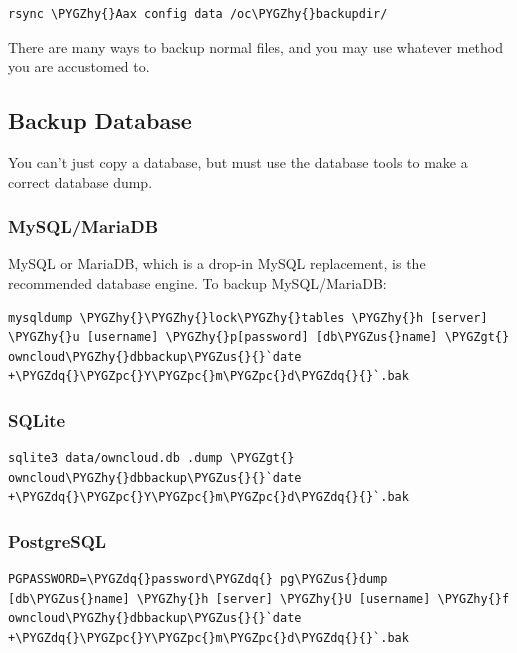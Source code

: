 \documentclass[letterpaper,10pt,english]{sphinxmanual}
\def\PYGZus{\char`\_}
\def\PYGZgt{\char`\>}
\def\PYGZpc{\char`\%}
\def\PYGZhy{\char`\-}
\def\PYGZdq{\char`\"}
\begin{document}
\begin{Verbatim}[commandchars=\\\{\}]
rsync \PYGZhy{}Aax config data /oc\PYGZhy{}backupdir/
\end{Verbatim}

There are many ways to backup normal files, and you may use whatever method you are accustomed to.


\subsection{Backup Database}
\label{maintenance/backup:backup-database}
You can't just copy a database, but must use the database tools to make a correct database dump.


\subsubsection{MySQL/MariaDB}
\label{maintenance/backup:mysql-mariadb}
MySQL or MariaDB, which is a drop-in MySQL replacement, is the recommended database engine. To backup MySQL/MariaDB:

\begin{Verbatim}[commandchars=\\\{\}]
mysqldump \PYGZhy{}\PYGZhy{}lock\PYGZhy{}tables \PYGZhy{}h [server] \PYGZhy{}u [username] \PYGZhy{}p[password] [db\PYGZus{}name] \PYGZgt{} owncloud\PYGZhy{}dbbackup\PYGZus{}{}`date +\PYGZdq{}\PYGZpc{}Y\PYGZpc{}m\PYGZpc{}d\PYGZdq{}{}`.bak
\end{Verbatim}


\subsubsection{SQLite}
\label{maintenance/backup:sqlite}
\begin{Verbatim}[commandchars=\\\{\}]
sqlite3 data/owncloud.db .dump \PYGZgt{} owncloud\PYGZhy{}dbbackup\PYGZus{}{}`date +\PYGZdq{}\PYGZpc{}Y\PYGZpc{}m\PYGZpc{}d\PYGZdq{}{}`.bak
\end{Verbatim}


\subsubsection{PostgreSQL}
\label{maintenance/backup:postgresql}
\begin{Verbatim}[commandchars=\\\{\}]
PGPASSWORD=\PYGZdq{}password\PYGZdq{} pg\PYGZus{}dump [db\PYGZus{}name] \PYGZhy{}h [server] \PYGZhy{}U [username] \PYGZhy{}f owncloud\PYGZhy{}dbbackup\PYGZus{}{}`date +\PYGZdq{}\PYGZpc{}Y\PYGZpc{}m\PYGZpc{}d\PYGZdq{}{}`.bak
\end{Verbatim}
\end{document}
